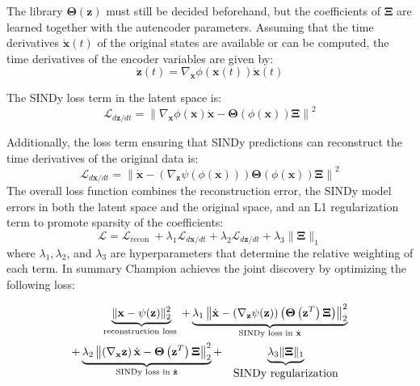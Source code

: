The library $\mathbf\Theta(\mathbf z)$ must still be decided beforehand, but the coefficients of $\mathbf\Xi$ are learned together with the autencoder parameters. Assuming that the time derivatives $\dot{\mathbf{x}}(t)$ of the original states are available or can be computed, the time derivatives of the encoder variables are given by:
\begin{equation}
    \dot{\mathbf{z}}(t)=\nabla_{\mathbf{x}} \phi(\mathbf{x}(t)) \dot{\mathbf{x}}(t)
\end{equation}

The SINDy loss term in the latent space is:
$$
\mathcal{L}_{d \mathbf{z} / d t}=\left\|\nabla_{\mathbf{x}} \phi(\mathbf{x}) \dot{\mathbf{x}}-\boldsymbol{\Theta}(\phi(\mathbf{x})) \boldsymbol{\Xi}\right\|^2
$$

Additionally, the loss term ensuring that SINDy predictions can reconstruct the time derivatives of the original data is:
$$
\mathcal{L}_{d \mathbf{x} / d t}=\left\|\dot{\mathbf{x}}-\left(\nabla_{\mathbf{z}} \psi(\phi(\mathbf{x}))\right) \boldsymbol{\Theta}(\phi(\mathbf{x})) \boldsymbol{\Xi}\right\|^2
$$
The overall loss function combines the reconstruction error, the SINDy model errors in both the latent space and the original space, and an L1 regularization term to promote sparsity of the coefficients:
\begin{equation}
    \mathcal{L}=\mathcal{L}_{\text {recon }}+\lambda_1 \mathcal{L}_{d \mathbf{x} / d t}+\lambda_2 \mathcal{L}_{d \mathbf{z} / d t}+\lambda_3\|\mathbf{\Xi}\|_1
\end{equation}
where $\lambda_1, \lambda_2$, and $\lambda_3$ are hyperparameters that determine the relative weighting of each term. In summary Champion achieves the joint discovery by optimizing the following loss:

\begin{align}
    \underbrace{\|\mathbf{x}-\psi(\mathbf{z})\|_2^2}_{\text {reconstruction loss }}
    +\underbrace{\lambda_1\left\|\dot{\mathbf{x}}-\left(\nabla_{\mathbf{z}} \psi(\mathbf{z})\right)\left(\boldsymbol{\Theta}\left(\mathbf{z}^T\right) \boldsymbol{\Xi}\right)\right\|_2^2}_{\text {SINDy loss in } \dot{\mathbf{x}}} \notag 
    \\
    +\underbrace{\lambda_2\left\|\left(\nabla_{\mathbf{x}} \mathbf{z}\right) \dot{\mathbf{x}}-\boldsymbol{\Theta}\left(\mathbf{z}^T\right) \boldsymbol{\Xi}\right\|_2^2}_{\text {SINDy loss in } \dot{\mathbf{z}}}+\underbrace{\lambda_3\|\boldsymbol{\Xi}\|_1}_{\begin{array}{c}\text { SINDy regularization }\end{array}}
\end{align}

